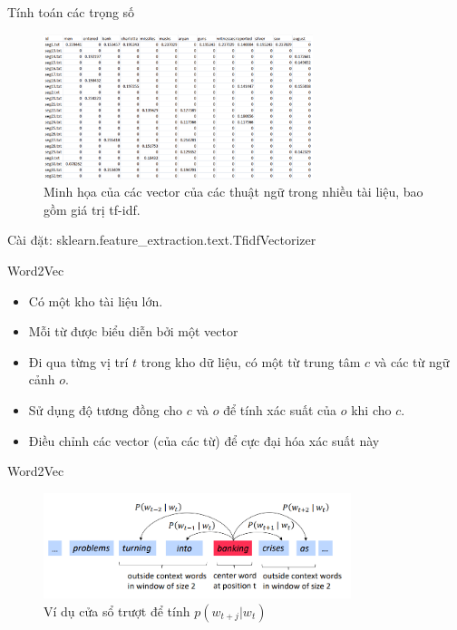 \documentclass[10pt]{beamer}
\theoremstyle{remark}
\theoremstyle{definition}
\begin{document}
\begin{frame}{Tính toán các trọng số}
	\begin{figure}[h!]
        \centering
        \includegraphics[width=0.7\textwidth]{1.png}
        \caption{Minh họa của các vector của các thuật ngữ trong nhiều tài liệu, bao gồm giá trị tf-idf.}
        \label{fig:1}
    \end{figure}
	Cài đặt: sklearn.feature\_extraction.text.TfidfVectorizer
\end{frame}

\begin{frame}{Word2Vec \cite{mikolov2013efficient}}
	\begin{itemize}
		\item Có một kho tài liệu lớn.
		\item Mỗi từ được biểu diễn bởi một vector
		\item Đi qua từng vị trí $t$ trong kho dữ liệu, có một từ trung tâm $c$ và các từ ngữ cảnh $o$.
		\item Sử dụng độ tương đồng cho $c$ và $o$ để tính xác suất của $o$ khi cho $c$.
		\item Điều chỉnh các vector (của các từ) để cực đại hóa xác suất này
	\end{itemize}
\end{frame}

\begin{frame}{Word2Vec}
	\begin{figure}[h!]
        \centering
        \includegraphics[width=0.8\textwidth]{word2vec.png}
        \caption{Ví dụ cửa sổ trượt để tính $p(w_{t + j} \vert w_t)$}
        \label{fig:word2vec}
    \end{figure}
\end{frame}
\end{document}
